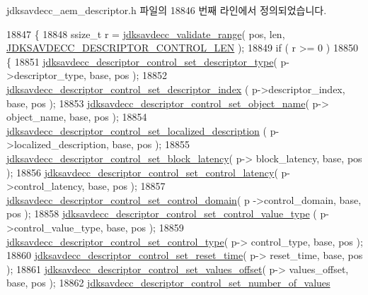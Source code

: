 jdksavdecc\+\_\+aem\+\_\+descriptor.\+h 파일의 18846 번째 라인에서 정의되었습니다.


\begin{DoxyCode}
18847 \{
18848     ssize\_t r = \hyperlink{group__util_ga9c02bdfe76c69163647c3196db7a73a1}{jdksavdecc\_validate\_range}( pos, len, 
      \hyperlink{group__descriptor__control_gae9df372af3485fb181d19f0a820260b1}{JDKSAVDECC\_DESCRIPTOR\_CONTROL\_LEN} );
18849     \textcolor{keywordflow}{if} ( r >= 0 )
18850     \{
18851         \hyperlink{group__descriptor__control_ga68e968a8d727416cfdf1297253c13fdb}{jdksavdecc\_descriptor\_control\_set\_descriptor\_type}(
       p->descriptor\_type, base, pos );
18852         \hyperlink{group__descriptor__control_gaba952bc0c57643a5fc9b16a0e59fb7dc}{jdksavdecc\_descriptor\_control\_set\_descriptor\_index}
      ( p->descriptor\_index, base, pos );
18853         \hyperlink{group__descriptor__control_gaa54f163c0218d1e08ef12b40fec4885f}{jdksavdecc\_descriptor\_control\_set\_object\_name}( p->
      object\_name, base, pos );
18854         \hyperlink{group__descriptor__control_gad50d129165fa3deb69c5012e5a6a84c2}{jdksavdecc\_descriptor\_control\_set\_localized\_description}
      ( p->localized\_description, base, pos );
18855         \hyperlink{group__descriptor__control_ga9338340fc545cdf4bbc854d04878a2d6}{jdksavdecc\_descriptor\_control\_set\_block\_latency}( p->
      block\_latency, base, pos );
18856         \hyperlink{group__descriptor__control_ga342a555f3b2973609238eb1e00af0b1c}{jdksavdecc\_descriptor\_control\_set\_control\_latency}(
       p->control\_latency, base, pos );
18857         \hyperlink{group__descriptor__control_ga14fcc353b60eacf46a5437724c5fa836}{jdksavdecc\_descriptor\_control\_set\_control\_domain}( p
      ->control\_domain, base, pos );
18858         \hyperlink{group__descriptor__control_ga6987d25fe8b350b840de8b60139c2904}{jdksavdecc\_descriptor\_control\_set\_control\_value\_type}
      ( p->control\_value\_type, base, pos );
18859         \hyperlink{group__descriptor__control_ga691519167438e133dd69dde015aabb92}{jdksavdecc\_descriptor\_control\_set\_control\_type}( p->
      control\_type, base, pos );
18860         \hyperlink{group__descriptor__control_gac0ea7b224c1c26c9d4f4e2315346a474}{jdksavdecc\_descriptor\_control\_set\_reset\_time}( p->
      reset\_time, base, pos );
18861         \hyperlink{group__descriptor__control_gae084def036aad40cee3174cbfea8b679}{jdksavdecc\_descriptor\_control\_set\_values\_offset}( p->
      values\_offset, base, pos );
18862         \hyperlink{group__descriptor__control_gae4c9466a2cf1565ab3de6358e6d9bfe9}{jdksavdecc\_descriptor\_control\_set\_number\_of\_values}

\end{DoxyCode}
